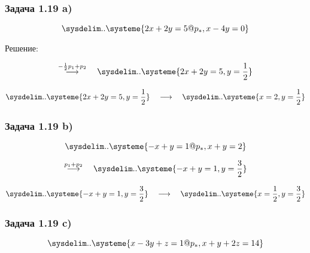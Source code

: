 \documentclass{subfiles}
\begin{document}
\subsubsection{Задача 1.19 a)}

\begin{equation*}
    \sysdelim..\systeme{
        2x + 2y = 5@p_{*},
        x - 4y = 0
    }
\end{equation*}

\noindent Решение:

\begin{equation*}
    \overset{-\frac{1}{2}p_{1} + p_{2}}{\longrightarrow}
    \quad
    \sysdelim..\systeme{
        2x + 2y = 5,
        y = \frac{1}{2}
    }
\end{equation*}

\begin{equation*}
    \sysdelim..\systeme{
        2x + 2y = 5,
        y = \frac{1}{2}
    }
    \quad
    \longrightarrow
    \quad
    \sysdelim..\systeme{
        x = 2,
        y = \frac{1}{2}
    }
\end{equation*}

\subsubsection{Задача 1.19 b)}

\begin{equation*}
    \sysdelim..\systeme{
        -x + y = 1@p_{*},
        x + y = 2
    }
\end{equation*}

\begin{equation*}
    \overset{p_{1} + p_{2}}{\longrightarrow}
    \quad
    \sysdelim..\systeme{
        -x + y = 1,
        y = \frac{3}{2}
    }
\end{equation*}

\begin{equation*}
    \sysdelim..\systeme{
        -x + y = 1,
        y = \frac{3}{2}
    }
    \quad
    \longrightarrow
    \quad
    \sysdelim..\systeme{
        x = \frac{1}{2},
        y = \frac{3}{2}
    }
\end{equation*}

\subsubsection{Задача 1.19 c)}

\begin{equation*}
    \sysdelim..\systeme{
        x - 3y + z = 1@p_{*},
        x + y + 2z = 14
    }
\end{equation*}
\end{document}
